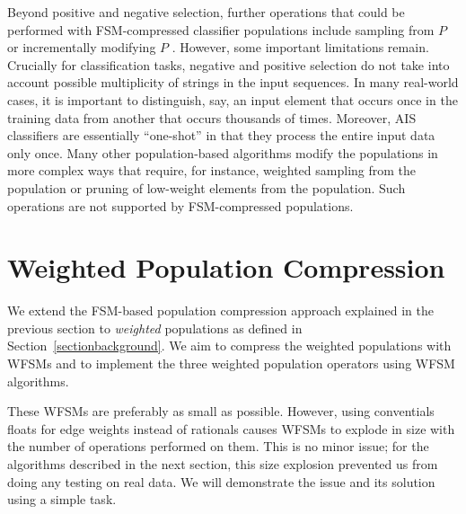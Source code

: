 \documentclass{llncs}
\begin{document}
Beyond positive and negative selection, further operations that could be performed with FSM-compressed classifier populations include sampling from $P$ or incrementally modifying $P$ \cite{Textor2014}. However, some important limitations remain. Crucially for classification tasks, negative and positive selection do not take into account possible multiplicity of strings in the input sequences. In many real-world cases, it is important to distinguish, say, an input element that occurs once in the training data from another that occurs thousands of times. Moreover, AIS classifiers are essentially ``one-shot'' in that they process the entire input data only once. Many other population-based algorithms modify the populations in more complex ways that require, for instance, weighted sampling from the population or pruning of low-weight elements from the population. Such operations are not supported by FSM-compressed populations.




\section{Weighted Population Compression}
\label{sectionfsms}\label{sectionwhyrationals}

We extend the FSM-based population compression approach explained in
the previous section to \emph{weighted} populations as defined in
Section~\ref{sectionbackground}.
We aim to compress the weighted populations with WFSMs and to
implement the three weighted population operators using WFSM
algorithms.

These WFSMs are preferably as small as possible.
However, using conventials floats for edge weights instead of
rationals causes WFSMs to explode in size with the number of
operations performed on them.
This is no minor issue;
for the algorithms described in the next section,
this size explosion prevented us from doing any testing on
real data. We will demonstrate the issue and its solution
using a simple task.
\end{document}
